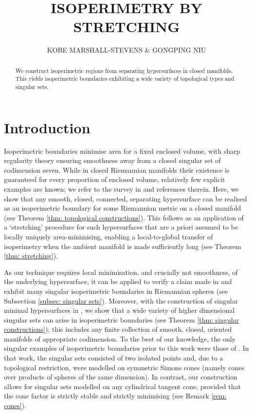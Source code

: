 \documentclass[12pt]{article}
\begin{document}
\title{\large \textbf{ISOPERIMETRY BY STRETCHING}}
\author{\small KOBE MARSHALL-STEVENS \& GONGPING NIU}
\date{\vspace{-5ex}}
\maketitle

\begin{abstract}
    \noindent We construct isoperimetric regions from separating hypersurfaces in closed manifolds. This yields isoperimetric boundaries exhibiting a wide variety of topological types and singular sets.
\end{abstract} 

\tableofcontents

\section{Introduction}\label{sec: introduction}

Isoperimetric boundaries minimise area for a fixed enclosed volume, with sharp regularity theory ensuring smoothness away from a closed singular set of codimension seven. While in closed Riemannian manifolds their existence is guaranteed for every proportion of enclosed volume, relatively few explicit examples are known; we refer to the survey in \cite[Appendix H]{EM13} and references therein. Here, we show that any smooth, closed, connected, separating hypersurface can be realised as an isoperimetric boundary for some Riemannian metric on a closed manifold (see Theorem \ref{thm: topological constructions}). This follows as an application of a `stretching' procedure for such hypersurfaces that are a priori assumed to be locally uniquely area-minimising, enabling a local-to-global transfer of isoperimetry when the ambient manifold is made sufficiently long (see Theorem \ref{thm: stretching}). 

\bigskip

As our technique requires local minimisation, and crucially not smoothness, of the underlying hypersurface, it can be applied to verify a claim made in \cite{M16} and exhibit many singular isoperimetric boundaries in Riemannian spheres (see Subsection \ref{subsec: singular sets}). Moreover, with the construction of singular minimal hypersurfaces in \cite{S00}, we show that a wide variety of higher dimensional singular sets can arise in isoperimetric boundaries (see Theorem \ref{thm: singular constructions}); this includes any finite collection of smooth, closed, oriented manifolds of appropriate codimension. To the best of our knowledge, the only singular examples of isoperimetric boundaries prior to this work were those of \cite{N24}. In that work, the singular sets consisted of two isolated points and, due to a topological restriction, were modelled on symmetric Simons cones (namely cones over products of spheres of the same dimension). In contrast, our construction allows for singular sets modelled on any cylindrical tangent cone, provided that the cone factor is strictly stable and strictly minimising (see Remark \ref{rem: cones}).
\end{document}
